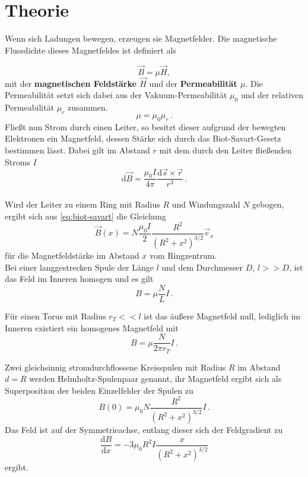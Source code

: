 \section{Theorie}
\label{sec:Theorie}
Wenn sich Ladungen bewegen, erzeugen sie Magnetfelder. Die magnetische Flussdichte
dieses Magnetfeldes ist definiert als

\begin{equation}
    \label{eq:BmuH}
    \vec{B}=μ\vec{H},
\end{equation}
mit der \textbf{magnetischen Feldstärke $\vec{H}$} und der \textbf{Permeabilität $μ$}.
Die Permeabilität setzt sich dabei aus der Vakuum-Permeabilität $μ_0$ und der relativen
Permeabilität $μ_r$ zusammen.
\begin{equation}
    μ = μ_0μ_r\,.
\end{equation}
Fließt nun Strom durch einen Leiter, so besitzt dieser aufgrund der bewegten Elektronen
ein Magnetfeld, dessen Stärke sich durch das Biot-Savart-Gesetz bestimmen lässt.
Dabei gilt im Abstand $r$ mit dem durch den Leiter fließenden Stroms $I$
\begin{equation}
    \label{eq:biot-savart}
    \text{d}\vec{B}= \dfrac{μ_0 I}{4π} \dfrac{\text{d}\vec{s} \times \vec{r}}{r^3}\,.
\end{equation}\\

Wird der Leiter zu einem Ring mit Radius $R$ und Windungszahl $N$ gebogen, ergibt sich
aus \eqref{eq:biot-savart} die Gleichung
\begin{equation}
    \vec{B}(x) = N\dfrac{μ_0I}{2}\dfrac{R^2}{(R^2+x^2)^{3/2}} \vec{e}_x
    \label{eq:BFeld}
\end{equation}
für die Magnetfeldstärke im Abstand $x$ vom Ringzentrum.\\

Bei einer langgestrecken Spule der Länge $l$ und dem Durchmesser $D$, $l>>D$, ist das Feld im
Inneren homogen und es gilt
\begin{equation}
    B=μ\dfrac{N}{L}I\,.
    \label{LangB}
\end{equation} 

Für einen Torus mit Radius $r_T<<l$ ist das äußere Magnetfeld null, lediglich im Inneren
existiert ein homogenes Magnetfeld mit
\begin{equation}
    B=μ\dfrac{N}{2πr_T}I\,.
    \label{RingB}
\end{equation}

Zwei gleichsinnig stromdurchflossene Kreisspulen mit Radius $R$ im Abstand $d=R$ werden
Helmholtz-Spulenpaar genannt, ihr Magnetfeld ergibt sich als Superposition der beiden
Einzelfelder der Spulen zu
\begin{equation}
    B(0)=μ_0N\dfrac{R^2}{(R^2+x^2)^{3/2}}I\,.
    \label{eq:HelmholtzB}
\end{equation}
Das Feld ist auf der Symmetrieachse, entlang dieser sich der Feldgradient zu
\begin{equation}
    \dfrac{\text{d}B}{\text{d}x} = -3μ_0R^2I\dfrac{x}{(R^2+x^2)^{3/2}}
\end{equation} ergibt.


